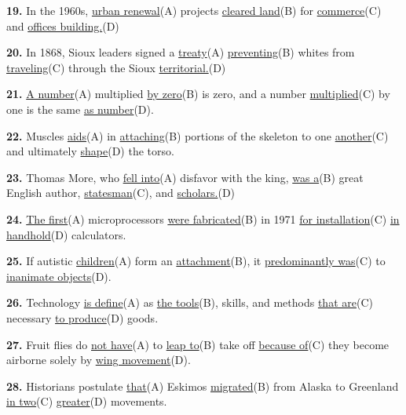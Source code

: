 \documentclass[12pt]{article}
\begin{document}
\vspace{\questionblockgap}
\noindent\textbf{19.} In the 1960s, \uline{urban renewal}(A) projects \uline{cleared land}(B) for \uline{commerce}(C) and \uline{offices building.}(D)
\par
\vspace{\questionblockgap}
\noindent\textbf{20.} In 1868, Sioux leaders signed a \uline{treaty}(A) \uline{preventing}(B) whites from \uline{traveling}(C) through the Sioux \uline{territorial.}(D)
\par
\vspace{\questionblockgap}
\noindent\textbf{21.} \uline{A number}(A) multiplied \uline{by zero}(B) is zero, and a number \uline{multiplied}(C) by one is the same \uline{as number}(D).
\par
\vspace{\questionblockgap}
\noindent\textbf{22.} Muscles \uline{aids}(A) in \uline{attaching}(B) portions of the skeleton to one \uline{another}(C) and ultimately \uline{shape}(D) the torso.
\par
\vspace{\questionblockgap}
\noindent\textbf{23.} Thomas More, who \uline{fell into}(A) disfavor with the king, \uline{was a}(B) great English author, \uline{statesman}(C), and \uline{scholars.}(D)
\par
\vspace{\questionblockgap}
\noindent\textbf{24.} \uline{The first}(A) microprocessors \uline{were fabricated}(B) in 1971 \uline{for installation}(C) \uline{in handhold}(D) calculators.
\par
\vspace{\questionblockgap}
\noindent\textbf{25.} If autistic \uline{children}(A) form an \uline{attachment}(B), it \uline{predominantly was}(C) to \uline{inanimate objects}(D).
\par
\vspace{\questionblockgap}
\noindent\textbf{26.} Technology \uline{is define}(A) as \uline{the tools}(B), skills, and methods \uline{that are}(C) necessary \uline{to produce}(D) goods.
\par
\vspace{\questionblockgap}
\noindent\textbf{27.} Fruit flies do \uline{not have}(A) to \uline{leap to}(B) take off \uline{because of}(C) they become airborne solely by \uline{wing movement}(D).
\par
\vspace{\questionblockgap}
\noindent\textbf{28.} Historians postulate \uline{that}(A) Eskimos \uline{migrated}(B) from Alaska to Greenland \uline{in two}(C) \uline{greater}(D) movements.
\end{document}
